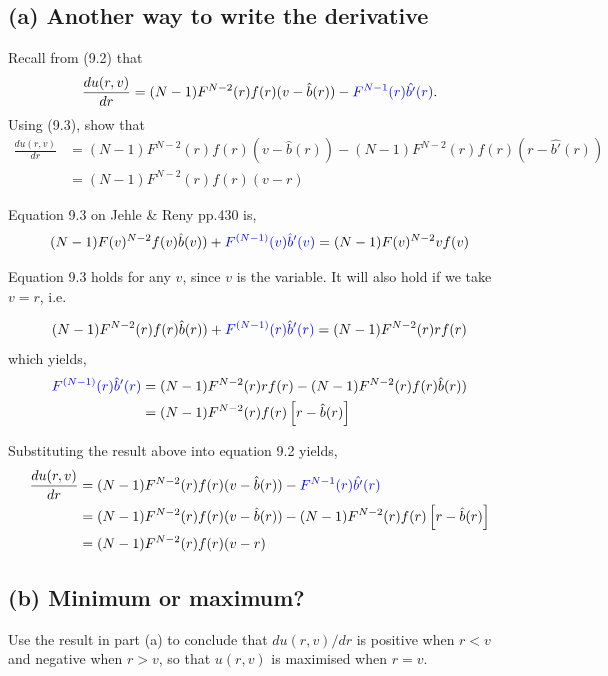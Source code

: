 \documentclass{article}
\begin{document}
\subsection*{(a) Another way to write the derivative} 

Recall from (9.2) that
$$\frac{du(r,v)}{dr}=(N-1)F^{N-2}(r)f(r)(v-\hat{b}(r))-\textcolor{blue}{F^{N-1}(r)\hat{b'}(r)}.$$
Using (9.3), show that
\begin{align*}
\frac{du(r,v)}{dr}&=(N-1)F^{N-2}(r)f(r)(v-\hat{b}(r))-(N-1)F^{N-2}(r)f(r)(r-\hat{b'}(r)) \\
&= (N-1)F^{N-2}(r)f(r)(v-r)
\end{align*}

\medskip

\begin{mdframed}[backgroundcolor=blue!20,linecolor=white]
Equation 9.3 on Jehle \& Reny pp.430 is,
$$(N-1)F(v)^{N-2}f(v)\hat{b}(v))+ \textcolor{blue}{F^{(N-1)}(v)\hat{b}'(v)} = (N-1)F(v)^{N-2}vf(v) $$
\end{mdframed}

Equation 9.3 holds for any $v$, since $v$ is the variable. It will also hold if we take $v=r$, i.e.

$$(N-1)F^{N-2}(r)f(r)\hat{b}(r))+ \textcolor{blue}{F^{(N-1)}(r)\hat{b}'(r)} = (N-1)F^{N-2}(r)rf(r) $$
which yields,
\begin{align*}
\textcolor{blue}{F^{(N-1)}(r)\hat{b}'(r)} &= (N-1)F^{N-2}(r)rf(r)-(N-1)F^{N-2}(r)f(r)\hat{b}(r)) \\
&=(N-1)F^{N-2}(r)f(r)\left[r - \hat{b}(r)\right]
\end{align*}

Substituting the result above into equation 9.2 yields,
\begin{align*}
\frac{du(r,v)}{dr}&=(N-1)F^{N-2}(r)f(r)(v-\hat{b}(r))-\textcolor{blue}{F^{N-1}(r)\hat{b'}(r)} \\
&=(N-1)F^{N-2}(r)f(r)(v-\hat{b}(r))-(N-1)F^{N-2}(r)f(r)\left[r - \hat{b}(r)\right] \\
&= (N-1)F^{N-2}(r)f(r)(v-r)
\end{align*}




\subsection*{(b) Minimum or maximum?}Use the result in part (a) to conclude that $du(r, v)/dr$ is positive when $r < v$ and negative when
$r > v$, so that $u(r, v)$ is maximised when $r = v$.
\end{document}
